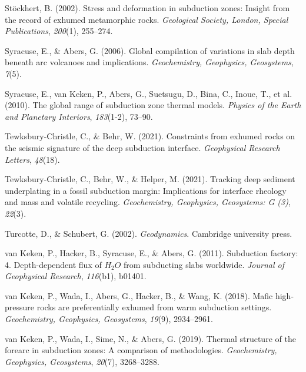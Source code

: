 \begin{CSLReferences}{1}{1}
\leavevmode{}%
Stöckhert, B. (2002). Stress and deformation in subduction zones: Insight from the record of exhumed metamorphic rocks. \emph{Geological Society, London, Special Publications}, \emph{200}(1), 255--274.

\leavevmode{}%
Syracuse, E., \& Abers, G. (2006). Global compilation of variations in slab depth beneath arc volcanoes and implications. \emph{Geochemistry, Geophysics, Geosystems}, \emph{7}(5).

\leavevmode{}%
Syracuse, E., van Keken, P., Abers, G., Suetsugu, D., Bina, C., Inoue, T., et al. (2010). The global range of subduction zone thermal models. \emph{Physics of the Earth and Planetary Interiors}, \emph{183}(1-2), 73--90.

\leavevmode{}%
Tewksbury-Christle, C., \& Behr, W. (2021). Constraints from exhumed rocks on the seismic signature of the deep subduction interface. \emph{Geophysical Research Letters}, \emph{48}(18).

\leavevmode{}%
Tewksbury-Christle, C., Behr, W., \& Helper, M. (2021). Tracking deep sediment underplating in a fossil subduction margin: Implications for interface rheology and mass and volatile recycling. \emph{Geochemistry, Geophysics, Geosystems: G (3)}, \emph{22}(3).

\leavevmode{}%
Turcotte, D., \& Schubert, G. (2002). \emph{Geodynamics}. Cambridge university press.

\leavevmode{}%
van Keken, P., Hacker, B., Syracuse, E., \& Abers, G. (2011). Subduction factory: 4. Depth-dependent flux of \(H_2O\) from subducting slabs worldwide. \emph{Journal of Geophysical Research}, \emph{116}(b1), b01401.

\leavevmode{}%
van Keken, P., Wada, I., Abers, G., Hacker, B., \& Wang, K. (2018). Mafic high-pressure rocks are preferentially exhumed from warm subduction settings. \emph{Geochemistry, Geophysics, Geosystems}, \emph{19}(9), 2934--2961.

\leavevmode{}%
van Keken, P., Wada, I., Sime, N., \& Abers, G. (2019). Thermal structure of the forearc in subduction zones: A comparison of methodologies. \emph{Geochemistry, Geophysics, Geosystems}, \emph{20}(7), 3268--3288.


\end{CSLReferences}
